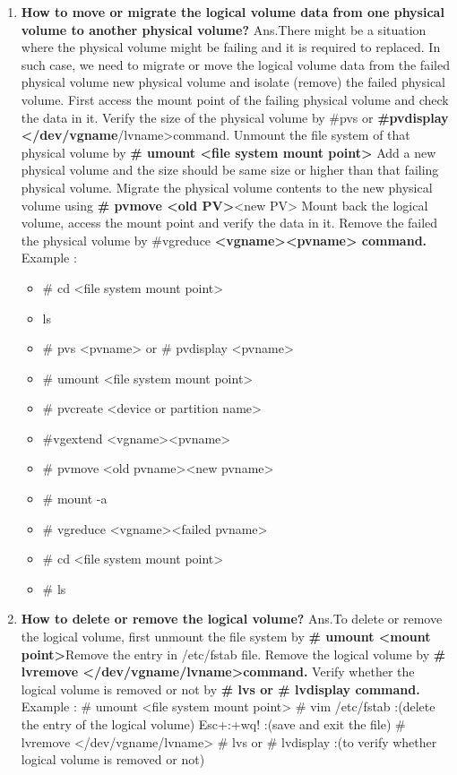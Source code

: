 \begin{enumerate}
\begin{enumerate}
     \item \textbf{How to move or migrate the logical volume data from one physical volume to another physical volume?}
     \newline
     Ans.There might be a situation where the physical volume might be failing and it is required to replaced. In such case, we need to migrate or move the logical volume data from the failed physical volume new physical volume and isolate (remove) the failed physical volume.
     First access the mount point of the failing physical volume and check the data in it.
     Verify the size of the physical volume by #pvs   or   \textbf{#pvdisplay   </dev/vgname}/lvname>command.
     Unmount the file system of that physical volume by \textbf{# umount   <file system mount point>}
     Add a new physical volume and the size should be same size or higher than that failing physical volume.
     Migrate the physical volume contents to the new physical volume using  \textbf{# pvmove  <old PV>}<new PV>
     Mount back the logical volume, access the mount point and verify the data in it.
     Remove the failed the physical volume by #vgreduce  \textbf{ <vgname><pvname>  command.}
     Example : \begin{itemize}
                   \item # cd   <file system mount point>
                   \item ls 
                   \item # pvs   <pvname>    or   # pvdisplay   <pvname>
                   \item # umount   <file system mount point>
                   \item # pvcreate   <device or partition name>
                   \item #vgextend    <vgname><pvname>
                   \item # pvmove   <old pvname><new pvname>
                   \item # mount   -a
                   \item # vgreduce    <vgname><failed pvname>
                   \item # cd   <file system mount point>
                   \item # ls
                \end{itemize}
    
    \bigskip
    \bigskip

    \item \textbf{How to delete or remove the logical volume?}
    \newline
    Ans.To delete or remove the logical volume, first unmount the file system by \textbf{# umount   <mount point>}Remove the entry in /etc/fstab file.
    Remove the logical volume by \textbf{# lvremove    </dev/vgname/lvname>command.}
    Verify whether the logical volume is removed or not by \textbf{# lvs   or   # lvdisplay   command.}
    Example : 	# umount   <file system mount point>
			# vim /etc/fstab  :(delete the entry of the logical volume)
			Esc+:+wq!	:(save and exit the file)
			# lvremove    </dev/vgname/lvname>
			# lvs    or    # lvdisplay :(to verify whether logical volume is removed or not)
 

\end{enumerate}
\end{enumerate}
